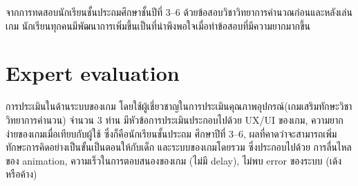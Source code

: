 จากการทดสอบนักเรียนชั้นประถมศึกษาชั้นปีที่ 3--6 ด้วยข้อสอบวิชาวิทยาการคำนวณก่อนและหลังเล่นเกม นักเรียนทุกคนมีพัฒนาการเพิ่มขึ้นเป็นที่น่าพึงพอใจเมื่อทำข้อสอบที่มีความยากมากขึ้น


\section{Expert evaluation}
การประเมินในด้านระบบของเกม โดยใช้ผู้เชี่ยวชาญในการประเมินคุณภาพอุปกรณ์(เกมเสริมทักษะวิชาวิทยาการคำนวน) จำนวน 3 ท่าน มีหัวข้อการประเมินประกอบไปด้วย UX/UI ของเกม, ความยากง่ายของเกมเมื่อเทียบกับผู้ใช้ ซึ่งก็คือนักเรียนชั้นประถม
ศึกษาปีที่ 3--6, ผลที่คาดว่าจะสามารถเพิ่มทักษะการคิดอย่างเป็นขั้นเป็นตอนให้กับเด็ก และระบบของเกมโดยรวม ซึ่งประกอบไปด้วย 
การลื่นไหลของ animation, ความเร็วในการตอบสนองของเกม (ไม่มี delay), ไม่พบ error ของระบบ (เด้งหรือค้าง)

